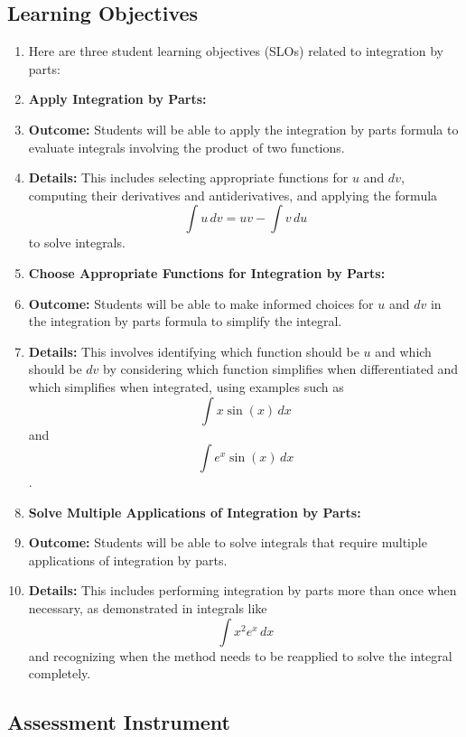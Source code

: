 \subsection{Learning Objectives}

\begin{enumerate}
    \item Here are three student learning objectives (SLOs) related to integration by parts:
    \item \textbf{Apply Integration by Parts:}
    \item \textbf{Outcome:} Students will be able to apply the integration by parts formula to evaluate integrals involving the product of two functions.
    \item \textbf{Details:} This includes selecting appropriate functions for $u$ and $dv$, computing their derivatives and antiderivatives, and applying the formula $$\int u \, dv = uv - \int v \, du$$ to solve integrals.
    \item \textbf{Choose Appropriate Functions for Integration by Parts:}
    \item \textbf{Outcome:} Students will be able to make informed choices for $u$ and $dv$ in the integration by parts formula to simplify the integral.
    \item \textbf{Details:} This involves identifying which function should be $u$ and which should be $dv$ by considering which function simplifies when differentiated and which simplifies when integrated, using examples such as $$\int x \sin(x) \, dx$$ and $$\int e^x \sin(x) \, dx$$.
    \item \textbf{Solve Multiple Applications of Integration by Parts:}
    \item \textbf{Outcome:} Students will be able to solve integrals that require multiple applications of integration by parts.
    \item \textbf{Details:} This includes performing integration by parts more than once when necessary, as demonstrated in integrals like $$\int x^2 e^x \, dx$$ and recognizing when the method needs to be reapplied to solve the integral completely.
\end{enumerate}

\subsection{Assessment Instrument}

